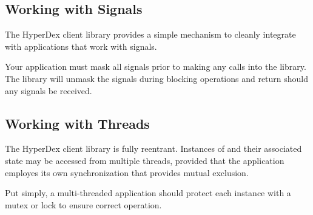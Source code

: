 

\subsection{Working with Signals}

The HyperDex client library provides a simple mechanism to cleanly integrate
with applications that work with signals.

Your application must mask all signals prior to making any calls into the
library.  The library will unmask the signals during blocking operations and
return  should any signals be received.

\subsection{Working with Threads}

The HyperDex client library is fully reentrant.  Instances of  and their associated state may be accessed from multiple
threads, provided that the application employes its own synchronization that
provides mutual exclusion.

Put simply, a multi-threaded application should protect each  instance with a mutex or lock to ensure correct operation.
